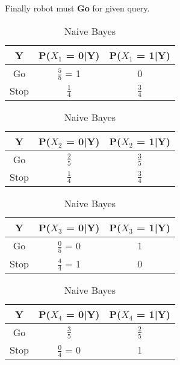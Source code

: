 \documentclass[en]{university}
\begin{document}
Finally robot must \textbf{Go} for given query.



\begin{table}
\centering
\begin{tabular}{|c|c|c|}
    \hline
    Y & P($X_1$ = 0|Y) & P($X_1$ = 1|Y) \\
    \hline
    Go & $\frac{5}{5}$ = 1 & 0 \\
    \hline
    Stop & $\frac{1}{4}$ & $\frac{3}{4}$ \\
    \hline
\end{tabular}
\centering
\begin{tabular}{|c|c|c|}
    \hline
    Y & P($X_2$ = 0|Y) & P($X_2$ = 1|Y) \\
    \hline
    Go & $\frac{2}{5}$ & $\frac{3}{5}$ \\
    \hline
    Stop & $\frac{1}{4}$ & $\frac{3}{4}$ \\
    \hline
\end{tabular}
\centering
\begin{tabular}{|c|c|c|}
    \hline
    Y & P($X_3$ = 0|Y) & P($X_3$ = 1|Y) \\
    \hline
    Go & $\frac{0}{5}$ = 0 & 1 \\
    \hline
    Stop & $\frac{4}{4}$ = 1 & 0 \\
    \hline
\end{tabular}
\centering
\begin{tabular}{|c|c|c|}
    \hline
    Y & P($X_4$ = 0|Y) & P($X_4$ = 1|Y) \\
    \hline
    Go & $\frac{3}{5}$ & $\frac{2}{5}$ \\
    \hline
    Stop & $\frac{0}{4}$ = 0 & 1 \\ 
    \hline
\end{tabular}
\caption{Naive Bayes}
\label{tab:naivebayes}
\end{table}
\end{document}
